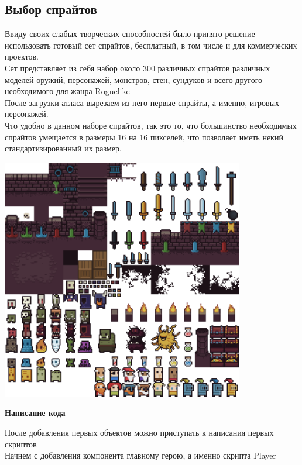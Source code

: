 \documentclass[a4paper,12pt]{article}
\begin{document}
\newpage
\subsection{Выбор спрайтов}
\noindent
Ввиду своих слабых творческих способностей было принято решение использовать готовый сет спрайтов, бесплатный, в том числе и для коммерческих проектов.\\ 
Сет представляет из себя набор около 300 различных спрайтов различных моделей оружий, персонажей, монстров, стен, сундуков и всего другого необходимого для жанра Roguelike \\
После загрузки атласа вырезаем из него первые спрайты, а именно, игровых персонажей. \\
Что удобно в данном наборе спрайтов, так это то, что большинство необходимых спрайтов умещается в размеры 16 на 16 пикселей, что позволяет иметь некий стандартизированный их размер. \\
\noindent
\centerline{\includegraphics[width = 400px]{pictures/Atlas.png}}


\newpage
\begin{center}
\textbf{Написание кода}\\
\end{center}
После добавления первых объектов можно приступать к написания первых скриптов \\
Начнем с добавления компонента главному герою, а именно скрипта Player \\
\end{document}
